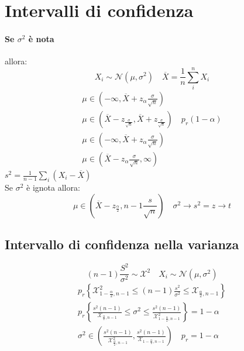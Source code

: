 \documentclass[]{article}
\begin{document}
    \section{Intervalli di confidenza}
    \paragraph{Se $\sigma^2$ è nota} allora:
    \[ X_i \sim \mathcal{N}(\mu, \sigma^2) \quad \overline{X} = \frac{1}{n} \sum_{i}^{n} X_i \]
    \begin{equation*}
        \begin{aligned}
            \mu \in (-\infty, \overline{X} + z_\alpha \frac{\sigma}{\sqrt{n}}) \\
            \mu \in (\overline{X} - z_{\frac{\sigma}{\sqrt{n}}}, \overline{X} + z_{\frac{\sigma}{\sqrt{n}}}) \quad p_r (1-\alpha) \\
            \mu \in (-\infty, \overline{X} + z_\alpha \frac{\sigma}{\sqrt{n}}) \\
            \mu \in (\overline{X} - z_\alpha \frac{\sigma}{\sqrt{n}}, \infty)
        \end{aligned}
    \end{equation*}
    $s^2 = \frac{1}{n - 1} \sum_{i}{} (X_i - \overline{X})$ \\
    Se $\sigma^2$ è ignota allora: \\
    \[ \mu \in (\overline{X} - z_{\frac{\alpha}{2}}, n - 1 \frac{s}{\sqrt{n}}) \quad \sigma^2 \rightarrow s^2 = z \rightarrow t \]
    \subsection{Intervallo di confidenza nella varianza}
    \[ (n-1) \frac{S^2}{\sigma^2} \sim \mathcal{X}^2 \quad X_i \sim \mathcal{N}(\mu, \sigma^2) \]
    \begin{equation*}
        \begin{aligned}
            p_r \left \{ \mathcal{X}_{1- \frac{\alpha}{2}, n - 1}^2 \leq (n-1)\frac{s^2}{\sigma^2} \leq \mathcal{X}_{\frac{\alpha}{2}, n-1} \right \} \\
            p_r \left \{ \frac{s^2(n-1)}{\mathcal{X}_{\frac{\alpha}{2}, n-1}} \leq \sigma^2 \leq \frac{s^2(n-1)}{\mathcal{X}_{1- \frac{\alpha}{2}, n - 1}^2} \right \} = 1-\alpha \\
            \sigma^2 \in \left (\frac{s^2(n-1)}{\mathcal{X}_{\frac{\alpha}{2}, n-1}^2}, \frac{s^2(n-1)}{\mathcal{X}_{1- \frac{\alpha}{2}, n-1}}\right )  \quad p_r = 1- \alpha
        \end{aligned}
    \end{equation*}
\end{document}
